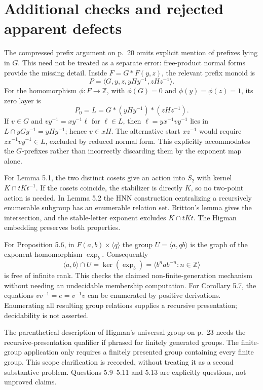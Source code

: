 \documentclass[10pt]{article}
\begin{document}
\section*{Additional checks and rejected apparent defects}
The compressed prefix argument on p. 20 omits explicit mention of prefixes lying in \(G\). This need not be treated as a separate error: free-product normal forms provide the missing detail. Inside \(F=G*F(y,z)\), the relevant prefix monoid is \[P=\langle G,y,z,yHy^{-1},zHz^{-1}\rangle .\] For the homomorphism \(\phi:F\to\mathbb Z\), with \(\phi(G)=0\) and \(\phi(y)=\phi(z)=1\), its zero layer is \[P_0=L=G*(yHy^{-1})*(zHz^{-1}).\] If \(v\in G\) and \(vy^{-1}=xy^{-1}\ell\) for \(\ell\in L\), then \(\ell=yx^{-1}vy^{-1}\) lies in \(L\cap yGy^{-1}=yHy^{-1}\); hence \(v\in xH\). The alternative start \(xz^{-1}\) would require \(zx^{-1}vy^{-1}\in L\), excluded by reduced normal form. This explicitly accommodates the \(G\)-prefixes rather than incorrectly discarding them by the exponent map alone.\par
For Lemma 5.1, the two distinct cosets give an action into \(S_2\) with kernel \(K\cap tKt^{-1}\). If the cosets coincide, the stabilizer is directly \(K\), so no two-point action is needed. In Lemma 5.2 the HNN construction centralizing a recursively enumerable subgroup has an enumerable relation set. Britton’s lemma gives the intersection, and the stable-letter exponent excludes \(K\cap tKt\). The Higman embedding preserves both properties.\par
For Proposition 5.6, in \(F(a,b)\times\langle q\rangle\) the group \(U=\langle a,qb\rangle\) is the graph of the exponent homomorphism \(\operatorname{exp}_b\). Consequently \[\langle a,b\rangle\cap U=\ker(\operatorname{exp}_b)
 =\langle b^nab^{-n}:n\in\mathbb Z\rangle\] is free of infinite rank. This checks the claimed non-finite-generation mechanism without needing an undecidable membership computation. For Corollary 5.7, the equations \(vv^{-1}=e=v^{-1}v\) can be enumerated by positive derivations. Enumerating all resulting group relations supplies a recursive presentation; decidability is not asserted.\par
The parenthetical description of Higman’s universal group on p. 23 needs the recursive-presentation qualifier if phrased for finitely generated groups. The finite-group application only requires a finitely presented group containing every finite group. This scope clarification is recorded, without treating it as a second substantive problem. Questions 5.9–5.11 and 5.13 are explicitly questions, not unproved claims.\par
\end{document}
